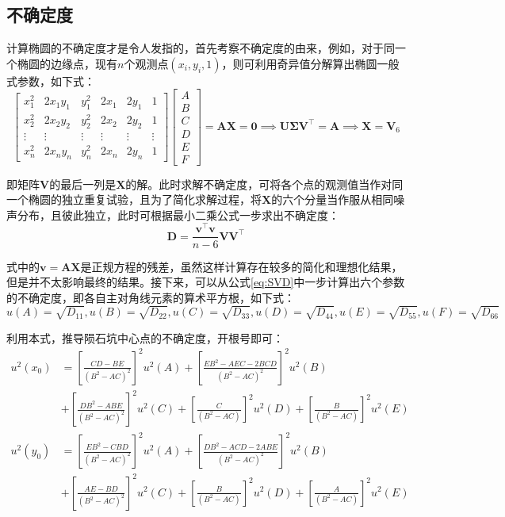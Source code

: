 \documentclass{article}
\begin{document}
\subsection{不确定度}
计算椭圆的不确定度才是令人发指的，首先考察不确定度的由来，例如，对于同一个椭圆的边缘点，现有$n$个观测点$(x_i,y_i,1)$，则可利用奇异值分解算出椭圆一般式参数，如下式：
\begin{equation*}
  \begin{bmatrix}
    x_1^2&2x_1y_1&y^2_1&2x_1&2y_1&1\\
    x_2^2&2x_2y_2&y^2_2&2x_2&2y_2&1\\
    \vdots&\vdots&\vdots&\vdots&\vdots&\vdots\\
    x_n^2&2x_ny_n&y^2_n&2x_n&2y_n&1
\end{bmatrix}
  \begin{bmatrix}
    A\\B\\C\\D\\E\\F
  \end{bmatrix}=\mathbf{AX}=\mathbf{0}\implies\mathbf{U}\mathbold{\Sigma}\mathbf{ V}^\top=\mathbf{A}\implies\mathbf{X}=\mathbf{V}_6
\end{equation*}\par
即矩阵$\mathbf{V}$的最后一列是$\mathbf{X}$的解。此时求解不确定度，可将各个点的观测值当作对同一个椭圆的独立重复试验，且为了简化求解过程，将$\mathbf{X}$的六个分量当作服从相同噪声分布，且彼此独立，此时可根据最小二乘公式一步求出不确定度：
\begin{equation}
  \mathbf{D}=\frac{\mathbf{v^\top v}}{n-6}\mathbf{VV^\top}
  \label{eq:SVD}
\end{equation}\par
式中的$\mathbf{v=AX}$是正规方程的残差，虽然这样计算存在较多的简化和理想化结果，但是并不太影响最终的结果。接下来，可以从公式\ref{eq:SVD}中一步计算出六个参数的不确定度，即各自主对角线元素的算术平方根，如下式：
\begin{equation*}
  u(A)=\sqrt{D_{11}},u(B)=\sqrt{D_{22}},u(C)=\sqrt{D_{33}},u(D)=\sqrt{D_{44}},u(E)=\sqrt{D_{55}},u(F)=\sqrt{D_{66}}
\end{equation*}\par
利用本式，推导陨石坑中心点的不确定度，开根号即可：
\begin{equation}
  \begin{aligned}
    u^2(x_0)&=\left[\frac{CD-BE}{(B^2-AC)^2}\right]^2u^2(A)+\left[\frac{EB^2-AEC-2BCD}{(B^2-AC)^2}\right]^2u^2(B)\\
    &+\left[\frac{DB^2-ABE}{(B^2-AC)^2}\right]^2u^2(C)+\left[\frac{C}{(B^2-AC)}\right]^2u^2(D)+\left[\frac{B}{(B^2-AC)}\right]^2u^2(E)\\
    u^2(y_0)&=\left[\frac{EB^2-CBD}{(B^2-AC)^2}\right]^2u^2(A)+\left[\frac{DB^2-ACD-2ABE}{(B^2-AC)^2}\right]^2u^2(B)\\
    &+\left[\frac{AE-BD}{(B^2-AC)^2}\right]^2u^2(C)+\left[\frac{B}{(B^2-AC)}\right]^2u^2(D)+\left[\frac{A}{(B^2-AC)}\right]^2u^2(E)\\
  \end{aligned}
\end{equation}\par
\end{document}
